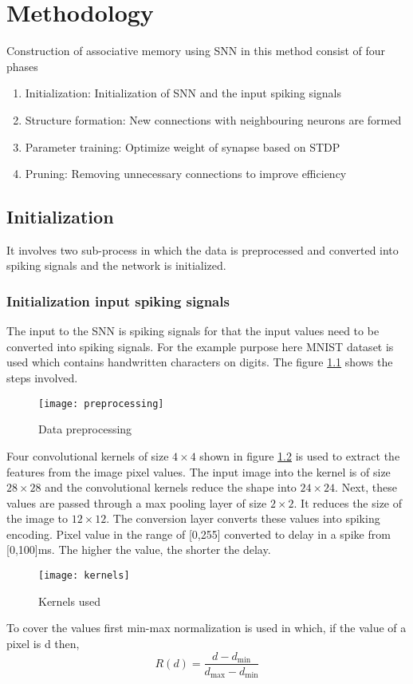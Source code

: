 \chapter{Methodology}

Construction of associative memory using SNN\cite{base} in this method consist
of four phases
\begin{enumerate}
    \itemsep0em
    \item Initialization: Initialization of SNN and the input spiking signals
    \item Structure formation: New connections with neighbouring neurons are formed
    \item Parameter training: Optimize weight of synapse based on STDP
    \item Pruning: Removing unnecessary connections to improve efficiency
\end{enumerate}
\section{Initialization}
It involves two sub-process in which the data is preprocessed and converted
into spiking signals and the network is initialized.
\subsection{Initialization input spiking signals}
The input to the SNN is spiking signals for that the input values need to be
converted into spiking signals. For the example purpose here MNIST dataset is
used which contains handwritten characters on digits. The figure
\ref{preprocessing} shows the steps involved.

\begin{figure}[h!]
    \centering
    \texttt{[image: preprocessing]}
    \caption{Data preprocessing}\label{preprocessing}
\end{figure}

Four convolutional kernels of size $4\times4$ shown in figure \ref{kernel} is
used to extract the features from the image pixel values. The input image into
the kernel is of size $28\times28$ and the convolutional kernels reduce the
shape into $24\times24$. Next, these values are passed through a max pooling
layer of size $2\times2$. It reduces the size of the image to $12\times12$. The
conversion layer converts these values into spiking encoding. Pixel value in
the range of [0,255] converted to delay in a spike from [0,100]ms. The higher
the value, the shorter the delay.
\begin{figure}[h!]
    \centering
    \texttt{[image: kernels]}
    \caption{Kernels used}\label{kernel}
\end{figure}
To cover the values first min-max normalization is used in which, if
the value of a pixel is d then,
\begin{equation*}
    R(d)=\frac{d-d_{\min}}{d_{\max}-d_{\min}}
\end{equation*}

